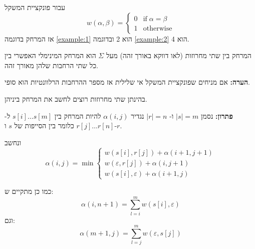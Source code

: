 עבור פונקציית המשקל
$$
w(\alpha, \beta) = 
\begin{cases}
0	& \text{if}\; \alpha = \beta
\\
1	& \text{otherwise}
\end{cases}
$$
אז המרחק בדוגמה 
\ref{example:1}
הוא 2 ובדוגמה
\ref{example:2}
הוא 4.

\begin{definition}[מרחק]
המרחק בין שתי מחרוזות (לאו דווקא באורך זהה) מעל 
$\Sigma$
הוא המרחק המינימלי האפשרי בין כל שתי הרחבות שלהן מאורך זהה.
\end{definition}

\textbf{הערה:}
אם מניחים שפונקציית המשקל אי שלילית אז מספר ההרחבות הרלוונטיות הוא סופי.


בהינתן שתי מחרוזות רוצים לחשב את המרחק ביניהן.

\textbf{פתרון:}
נסמן 
$|s| = m$
ו-%
$|r| = n$
נגדיר
$\alpha(i, j)$
להיות המרחק בין 
$s[i] \ldots s[m]$
ל-%
$r[j] \ldots r[n]$
כלומר בין הסייפות של $s$ ו-$r$.

ונחשב
$$
\alpha(i, j) = \min
\begin{cases}
w(s[i], r[j]) + \alpha(i + 1, j + 1)
\\
w(\varepsilon, r[j]) + \alpha(i, j + 1)
\\
w(s[i], \varepsilon) + \alpha(i + 1, j)
\end{cases}
$$

כמו כן מתקיים ש:%
$$
\alpha(i, n + 1) = \sum_{l = i}^m w(s[i], \varepsilon)
$$
וגם:
$$
\alpha(m + 1, j) = \sum_{l = j}^m w(\varepsilon, s[j])
$$
